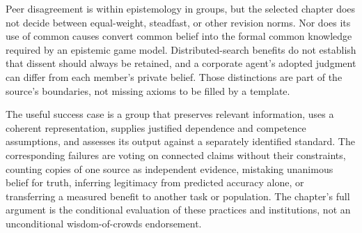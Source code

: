 Peer disagreement is within epistemology in groups, but the selected
chapter does not decide between equal-weight, steadfast, or other
revision norms. Nor does its use of common causes convert common belief
into the formal common knowledge required by an epistemic game model.
Distributed-search benefits do not establish that dissent should always
be retained, and a corporate agent's adopted judgment can differ from
each member's private belief. Those distinctions are part of the
source's boundaries, not missing axioms to be filled by a template.

The useful success case is a group that preserves relevant information,
uses a coherent representation, supplies justified dependence and
competence assumptions, and assesses its output against a separately
identified standard. The corresponding failures are voting on connected
claims without their constraints, counting copies of one source as
independent evidence, mistaking unanimous belief for truth, inferring
legitimacy from predicted accuracy alone, or transferring a measured
benefit to another task or population. The chapter's full argument is
the conditional evaluation of these practices and institutions, not an
unconditional wisdom-of-crowds endorsement.
